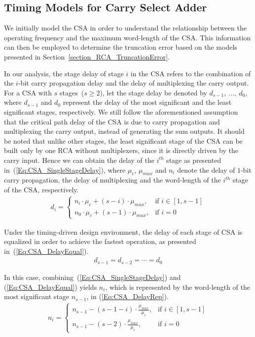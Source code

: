 \documentclass[prodmode,acmtrets]{acmsmall} %
\begin{document}
\subsection{Timing Models for Carry Select Adder}
We initially model the CSA in order to understand the relationship between the operating frequency and the maximum word-length of the CSA. This information can then be employed to determine the truncation error based on the models presented in Section~\ref{section_RCA_TruncationError}.

In our analysis, the stage delay of stage $i$ in the CSA refers to the combination of the $i$-bit carry propagation delay and the delay of multiplexing the carry output. For a CSA with $s$ stages~($s\geqslant 2$), let the stage delay be denoted by $d_{s-1},~\dots,~d_{0}$, where $d_{s-1}$ and $d_{0}$ represent the delay of the most significant and the least significant stages, respectively. We still follow the aforementioned assumption that the critical path delay of the CSA is due to carry propagation and multiplexing the carry output, instead of generating the sum outputs. It should be noted that unlike other stages, the least significant stage of the CSA can be built only by one RCA without multiplexers, since it is directly driven by the carry input. Hence we can obtain the delay of the $i^{th}$ stage as presented in~(\ref{Eq:CSA_SingleStageDelay}), where $\mu_{c}$, $\mu_{mux}$ and $n_i$ denote the delay of $1$-bit carry propagation, the delay of multiplexing and the word-length of the $i^{th}$ stage of the CSA, respectively.
%
\begin{eqnarray}\label{Eq:CSA_SingleStageDelay}
  d_i=\left\{
    \begin{matrix}
      n_i\cdot \mu_{c}+(s-i)\cdot\mu_{mux}, &\textrm{if $i\in\left[1,s-1\right]$}\\
      n_0\cdot \mu_c + (s-1)\cdot\mu_{mux}, & \textrm{if $i=0$}
    \end{matrix}
  \right.
\end{eqnarray}

Under the timing-driven design environment, the delay of each stage of CSA is equalized in order to achieve the fastest operation, as presented in~(\ref{Eq:CSA_DelayEqual}).
%
\begin{eqnarray}\label{Eq:CSA_DelayEqual}
  d_{s-1}=d_{s-2}=\cdots=d_{0}
\end{eqnarray}

In this case, combining~(\ref{Eq:CSA_SingleStageDelay}) and (\ref{Eq:CSA_DelayEqual}) yields $n_i$, which is represented by the word-length of the most significant stage $n_{s-1}$, in (\ref{Eq:CSA_DelayRep}).
%
\begin{eqnarray}\label{Eq:CSA_DelayRep}
 n_i=\left\{
	\begin{matrix}
	  n_{s-1}-(s-1-i)\cdot\frac{\mu_{mux}}{\mu_c}, & \textrm{if $i\in\left[1,s-1\right]$}\\
	  n_{s-1}-(s-2)\cdot\frac{\mu_{mux}}{\mu_c}, &\textrm{if $i=0$}
	\end{matrix}
    \right.
\end{eqnarray}
\end{document}
